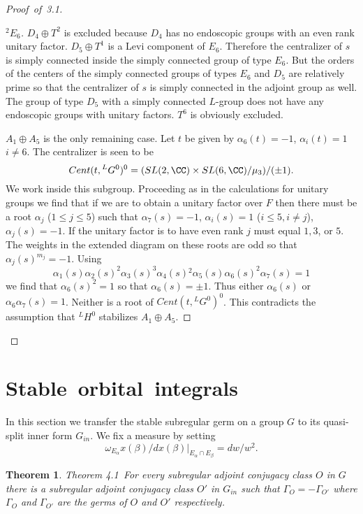 \documentclass{memo-l}
\newtheorem{theorem}{Theorem}[section]
\theoremstyle{definition}
\theoremstyle{remark}
\numberwithin{section}{chapter}
\numberwithin{equation}{chapter}
\begin{document}
\begin{proof}[Proof\ of\ 3.1]
\begin{proof}[${}^{2}E_{6}$]
   $D_{4}\oplus T^{2}$ is excluded because $D_{4}$ has no endoscopic groups with
an even rank unitary factor.  $D_{5}\oplus T^{1}$ is a Levi component of
$E_{6}$.  Therefore the centralizer of $s$ is simply connected inside the
simply connected group of type $E_{6}$.  But the orders of the centers of
the simply connected groups of types $E_{6}$ and $D_{5}$ are relatively
prime so that the centralizer of $s$ is simply connected in the adjoint
group as well.  The group of type $D_{5}$ with a simply connected $L$-group
does not have any endoscopic groups with unitary factors.  $T^{6}$ is
obviously excluded.

   $A_{1}\oplus A_{5}$ is the only remaining case.  Let $t$ be given by
${\alpha}_{6}(t) = -1$, ${\alpha}_{i}(t) = 1$ $i \ne 6$.  The centralizer is seen to
be
$$
Cent(t,{}^{L}G^{0})^{0}  =  (SL(2,{\CC}) \times
SL(6,{\CC})/{\mu}_{3})/({\pm}1).
$$
We work inside this subgroup.  Proceeding as in the calculations for
unitary groups we find that if we are to obtain a unitary factor over $F$
then there must be a root ${\alpha}_{j}$ ($1 \le  j \le  5$) such that
${\alpha}_{7}(s)  =  -1$, ${\alpha}_{i}(s)  =  1$ ($i \le  5, i \ne j$),
${\alpha}_{j}(s)  =  -1$.  If the unitary factor is to have even rank $j$ must
equal $1, 3$, or $5$.  The weights in the extended diagram on these roots
are odd so that ${\alpha}_{j}(s)^{m_{j}} =  -1$.  Using
$$
{\alpha}_{1}(s){\alpha}_{2}(s)^{2}{\alpha}_{3}(s)^{3}
{\alpha}_{4}(s){}^{2}{\alpha}_5(s)\alpha_6(s)^2\alpha_7(s)=1
$$
we find that ${\alpha}_{6}(s)^{2}  =  1$ so that ${\alpha}_{6}(s)  =
{\pm}1$.  Thus either ${\alpha}_{6}(s)$ or ${\alpha}_{6}{\alpha}_{7}(s)
 =  1$.  Neither is a root of $Cent(t,{}^{L}G^{0})^{0}$.  This contradicts the
assumption that ${}^{L}H^{0}$ stabilizes $A_{1}\oplus A_{5}$.
\phantom\qedhere
\end{proof}


\end{proof}


\section{Stable\ orbital\ integrals}


   In this section we transfer the stable subregular germ on a group $G$ to its
quasi-split inner form $G_{in}$.  We fix a measure by setting
$$
{\omega}_{E_\alpha} x({\beta})/dx({\beta})\vert_{E_{{\alpha}} {\cap}
E_{{\beta}}}  =  dw/w^{2}.
$$

\medpagebreak

\begin{theorem}{Theorem 4.1}\ For every subregular adjoint conjugacy class
$O$ in $G$ there is a subregular adjoint conjugacy class $O'$ in $G_{in}$
such that ${\Gamma}_{O}  =  -{\Gamma}_{O'}$ where ${\Gamma}_{O}$ and
${\Gamma}_{O'}$ are the germs of $O$ and $O'$ respectively.
\end{theorem}
\end{document}
